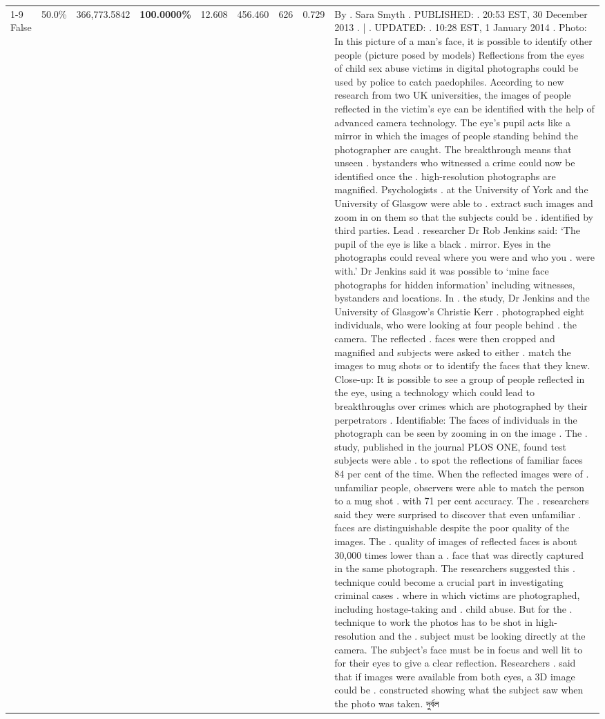 \begin{table}[H]
\begin{tabular}{lllrlllll}
\cline{1-9}
False & 50.0\% & 366,773.5842 & \bfseries \color{red} 100.0000\% & 12.608 & 456.460 & 626 & 0.729 & By . Sara Smyth . PUBLISHED: . 20:53 EST, 30 December 2013 . | . UPDATED: . 10:28 EST, 1 January 2014 . Photo: In this picture of a man's face, it is possible to identify other people (picture posed by models) Reflections from the eyes of child sex abuse victims in digital photographs could be used by police to catch paedophiles. According to new research from two UK universities, the images of people reflected in the victim's eye can be identified with the help of advanced camera technology. The eye's pupil acts like a mirror in which the images of people standing behind the photographer are caught. The breakthrough means that unseen . bystanders who witnessed a crime could now be identified once the . high-resolution photographs are magnified. Psychologists . at the University of York and the University of Glasgow were able to . extract such images and zoom in on them so that the subjects could be . identified by third parties. Lead . researcher Dr Rob Jenkins said: ‘The pupil of the eye is like a black . mirror. Eyes in the photographs could reveal where you were and who you . were with.' Dr Jenkins said it was possible to ‘mine face photographs for hidden information' including witnesses, bystanders and locations. In . the study, Dr Jenkins and the University of Glasgow's Christie Kerr . photographed eight individuals, who were looking at four people behind . the camera. The reflected . faces were then cropped and magnified and subjects were asked to either . match the images to mug shots or to identify the faces that they knew. Close-up: It is possible to see a group of people reflected in the eye, using a technology which could lead to breakthroughs over crimes which are photographed by their perpetrators . Identifiable: The faces of individuals in the photograph can be seen by zooming in on the image . The . study, published in the journal PLOS ONE, found test subjects were able . to spot the reflections of familiar faces 84 per cent of the time. When the reflected images were of . unfamiliar people, observers were able to match the person to a mug shot . with 71 per cent accuracy. The . researchers said they were surprised to discover that even unfamiliar . faces are distinguishable despite the poor quality of the images. The . quality of images of reflected faces is about 30,000 times lower than a . face that was directly captured in the same photograph. The researchers suggested this . technique could become a crucial part in investigating criminal cases . where in which victims are photographed, including hostage-taking and . child abuse. But for the . technique to work the photos has to be shot in high-resolution and the . subject must be looking directly at the camera. The subject's face must be in focus and well lit to for their eyes to give a clear reflection. Researchers . said that if images were available from both eyes, a 3D image could be . constructed showing what the subject saw when the photo was taken. দুর্বল \\

\end{tabular}
\end{table}
